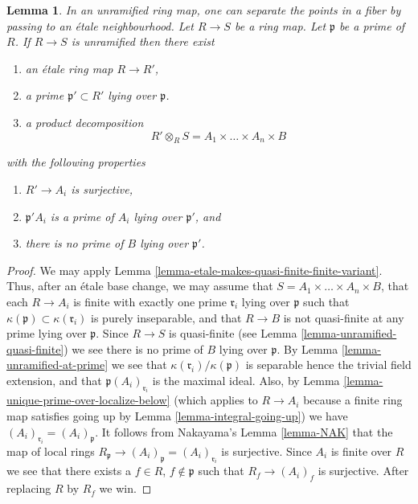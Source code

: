 \documentclass[10pt,a4paper]{amsart}
\newenvironment{slogan}{\comment}{\endcomment}
\theoremstyle{plain}
\newtheorem{lemma}[subsection]{Lemma}
\theoremstyle{definition}
\theoremstyle{remark}
\numberwithin{equation}{subsection}
\begin{document}
\begin{lemma}
\label{lemma-etale-makes-unramified-closed}
\begin{slogan}
In an unramified ring map, one can separate the points in a fiber
by passing to an \'etale neighbourhood.
\end{slogan}
Let $R \to S$ be a ring map.
Let $\mathfrak p$ be a prime of $R$.
If $R \to S$ is unramified then there exist
\begin{enumerate}
\item an \'etale ring map $R \to R'$,
\item a prime $\mathfrak p' \subset R'$ lying over $\mathfrak p$.
\item a product decomposition
$$
R' \otimes_R S = A_1 \times \ldots \times A_n \times B
$$
\end{enumerate}
with the following properties
\begin{enumerate}
\item $R' \to A_i$ is surjective,
\item $\mathfrak p'A_i$ is a prime of $A_i$ lying over $\mathfrak p'$, and
\item there is no prime of $B$ lying over $\mathfrak p'$.
\end{enumerate}
\end{lemma}

\begin{proof}
We may apply Lemma \ref{lemma-etale-makes-quasi-finite-finite-variant}.
Thus, after an \'etale base change,
we may assume that $S = A_1 \times \ldots \times A_n \times B$,
that each $R \to A_i$ is finite with exactly one prime $\mathfrak r_i$
lying over $\mathfrak p$ such that
$\kappa(\mathfrak p) \subset \kappa(\mathfrak r_i)$ is purely inseparable,
and that $R \to B$ is not quasi-finite at any prime lying over $\mathfrak p$.
Since $R \to S$ is quasi-finite (see
Lemma \ref{lemma-unramified-quasi-finite})
we see there is no prime of $B$ lying over $\mathfrak p$.
By Lemma \ref{lemma-unramified-at-prime} we see that
$\kappa(\mathfrak r_i)/\kappa(\mathfrak p)$
is separable hence the trivial field extension, and that
$\mathfrak p(A_i)_{\mathfrak r_i}$ is the maximal ideal.
Also, by Lemma \ref{lemma-unique-prime-over-localize-below}
(which applies to $R \to A_i$ because a finite ring map satisfies going up by
Lemma \ref{lemma-integral-going-up})
we have $(A_i)_{\mathfrak r_i} = (A_i)_{\mathfrak p}$.
It follows from Nakayama's Lemma \ref{lemma-NAK}
that the map of local rings
$R_{\mathfrak p} \to (A_i)_{\mathfrak p} = (A_i)_{\mathfrak r_i}$
is surjective. Since $A_i$ is finite over $R$ we see that there
exists a $f \in R$, $f \not \in \mathfrak p$ such that
$R_f \to (A_i)_f$ is surjective. After replacing $R$ by $R_f$ we win.
\end{proof}
\end{document}
